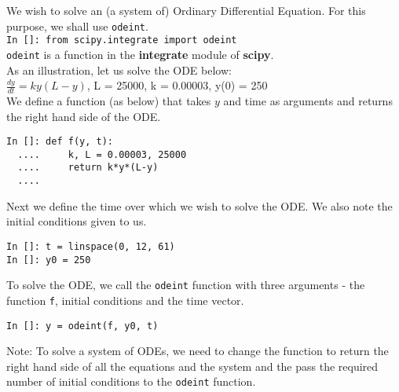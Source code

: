 \documentclass[12pt]{article}
\newcommand{\typ}[1]{\lstinline{#1}}
\begin{document}
We wish to solve an (a system of) Ordinary Differential Equation. For this purpose, we shall use \typ{odeint}.\\
\typ{In []: from scipy.integrate import odeint}\\
\typ{odeint} is a function in the \textbf{integrate} module of \textbf{scipy}.\\
As an illustration, let us solve the ODE below:\\
$\frac{dy}{dt} = ky(L-y)$, L = 25000, k = 0.00003, y(0) = 250\\
We define a function (as below) that takes $y$ and time as arguments and returns the right hand side of the ODE.
\begin{lstlisting}
In []: def f(y, t):
  ....     k, L = 0.00003, 25000
  ....     return k*y*(L-y)
  ....
\end{lstlisting}
Next we define the time over which we wish to solve the ODE. We also note the initial conditions given to us.
\begin{lstlisting}
In []: t = linspace(0, 12, 61)
In []: y0 = 250
\end{lstlisting}
To solve the ODE, we call the \typ{odeint} function with three arguments - the function \typ{f}, initial conditions and the time vector. 
\begin{lstlisting}
In []: y = odeint(f, y0, t)
\end{lstlisting}
Note: To solve a system of ODEs, we need to change the function to return the right hand side of all the equations and the system and the pass the required number of initial conditions to the \typ{odeint} function.
\end{document}
